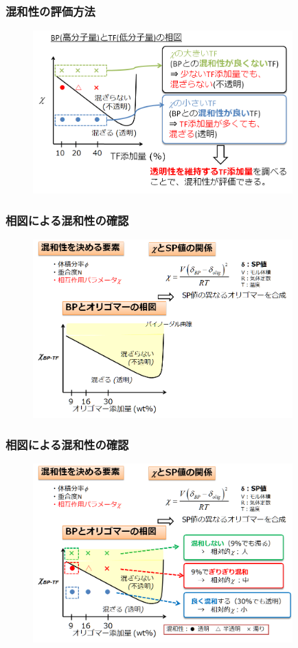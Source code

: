 \documentclass[12pt, dvipdfmx]{beamer}
\begin{document}
\begin{frame}\frametitle{混和性の評価方法}
	\begin{figure}
		\begin{center}
			\includegraphics[width=100mm]{kanngaekata.png}
		\end{center}
	\end{figure}
\end{frame}

%
\begin{frame}\frametitle{相図による混和性の確認}
	\begin{figure}
		\begin{center}
			\includegraphics[width=100mm]{souzu_1.png}
		\end{center}
	\end{figure}
\end{frame}

%
\begin{frame}\frametitle{相図による混和性の確認}
	\begin{figure}
		\begin{center}
			\includegraphics[width=100mm]{souzu_2.png}
		\end{center}
	\end{figure}
\end{frame}
\end{document}
